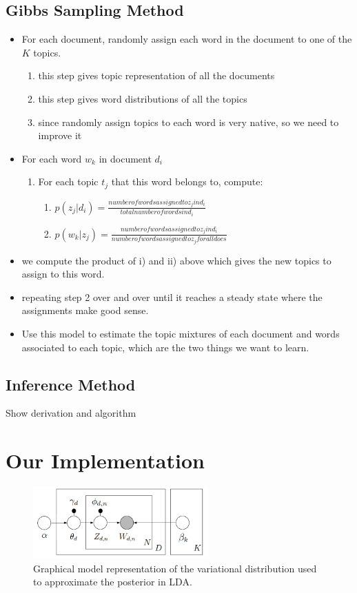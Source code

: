 \documentclass{article} %
\begin{document}
\subsection{Gibbs Sampling Method}
\begin{itemize}
\item For each document, randomly assign each word in the document to one of the $K$ topics.
\begin{enumerate}
\item this step gives topic representation of all the documents
\item this step gives word distributions of all the topics
\item since randomly assign topics to each word is very native, so we need to improve it
\end{enumerate}
\item For each word $w_k$ in document $d_i$
\begin{enumerate}
\item For each topic $t_j$ that this word belongs to, compute:
\begin{enumerate}
\item $p(z_j | d_i)  = \frac{number of words assigned to z_j in d_i}{total number of words in d_i}$
\item $p( w_k |  z_j) = \frac{number of words assigned to z_j in d_i}{number of words assigned to z_j for all docs}$
\end{enumerate}
\end{enumerate}
\item we compute the product of i) and ii) above which gives the new topics to assign to this word.
\item repeating step 2 over and over until it reaches a steady state where the assignments make good sense.
\item Use this model to estimate the topic mixtures of each document and words associated to each topic, which are the two things we want to learn.
\end{itemize}



\subsection{Inference Method}
Show derivation and algorithm

\section{Our Implementation}
\begin{figure}
    \centering
    \includegraphics[width=0.6\textwidth]{vi}
    \caption{Graphical model representation of the variational distribution used to approximate the posterior in LDA.}
    \label{fig:graphmodel}
\end{figure}
\end{document}
